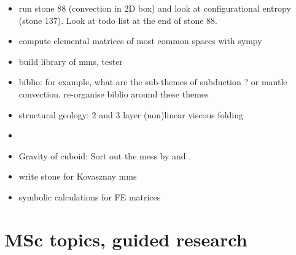 \documentclass[a4paper]{article}
\begin{document}
\begin{itemize}
\item run stone 88 (convection in 2D box) and look at configurational entropy 
(stone 137). Look at todo list at the end of stone 88.
\item compute elemental matrices of most common spaces with sympy
\item build library of mms, tester
\item biblio: for example, what are the sub-themes of subduction ? 
or mantle convection. re-organise biblio around these themes
\item structural geology: 2 and 3 layer (non)linear viscous folding
\item {}
\item Gravity of cuboid: Sort out the mess by \textcite{duti16} and \textcite{zhhu17}.
\item write stone for Kovasznay mms
\item symbolic calculations for FE matrices
\end{itemize}

\newpage
\section{MSc topics, guided research}
\end{document}
